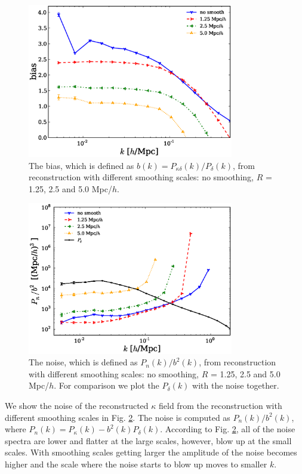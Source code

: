 \documentclass[aps,prd,twocolumn,showpacs,superscriptaddress,groupedaddress,nofootinbib]{revtex4}  %
\begin{document}
\begin{figure}[h!]
     \centering
     \includegraphics[width=9cm]{1D_bias_smooth.eps}
     \caption{The bias, which is defined as $b(k) = P_{\kappa\delta}(k)/P_{\delta}(k)$, from reconstruction with different smoothing scales: no smoothing, $R$ = 1.25, 2.5 and 5.0 Mpc/$h$.}
     \label{1D_bias_smooth}
\end{figure}

\begin{figure}[h!]
     \centering
     \includegraphics[width=9cm]{1D_noise_bias_smooth.eps}
     \caption{The noise, which is defined as  $P_{n}(k)/b^2(k)$, from reconstruction with different smoothing scales: no smoothing, $R$ = 1.25, 2.5 and 5.0 Mpc/$h$. For comparison we plot the $P_{\delta}(k)$ with the noise together.}
     \label{1D_noise_bias}
     \end{figure}

We show the noise of the reconstructed $\kappa$ field from the reconstruction with different smoothing scales in Fig. \ref{1D_noise_bias}. The noise is computed as $P_{n}(k)/b^2(k)$, where $P_{n}(k) = P_{\kappa}(k) - b^2(k)P_{\delta}(k)$.  According to Fig. \ref{1D_noise_bias}, all of the noise spectra are lower and flatter at the large scales, however, blow up at the small scales. With smoothing scales getting larger the amplitude of the noise becomes higher and the scale where the noise starts to blow up moves to smaller $k$.
\end{document}
